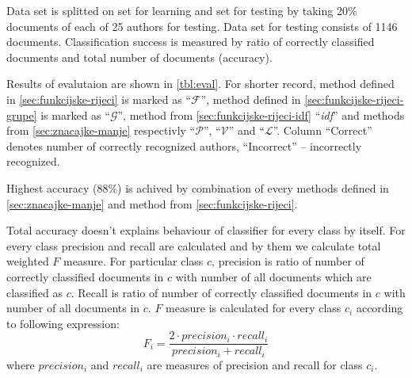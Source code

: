 \documentclass[11pt,english]{article}
\begin{document}
\begin{multicols}{2}
Data set is splitted on set for learning and set for testing by taking 20\%
documents of each of 25 authors for testing. Data set for testing consists of
1146 documents. Classification success is measured by ratio of correctly
classified documents and total number of documents (accuracy).

Results of evalutaion are shown in \ref{tbl:eval}. For shorter record, method
defined in \ref{sec:funkcijske-rijeci} is marked as ``$\mathcal{F}$'', method
defined in \ref{sec:funkcijske-rijeci-grupe} is marked as ``$\mathcal{G}$'',
method from \ref{sec:funkcijske-rijeci-idf} ``\emph{idf}'' and methods from
\ref{sec:znacajke-manje} respectivly ``$\mathcal{P}$'', ``$\mathcal{V}$'' and
``$\mathcal{L}$''. Column ``Correct'' denotes number of correctly
recognized authors, ``Incorrect'' -- incorrectly recognized.

Highest accuracy (88\%) is achived by combination of every methods defined in
\ref{sec:znacajke-manje} and method from \ref{sec:funkcijske-rijeci}.

Total accuracy doesn't explains behaviour of classifier for every class by
itself. For every class precision and recall are calculated and by them we
calculate total weighted $F$ measure. For particular class $c$, precision is
ratio of number of correctly classified documents in $c$ with number of all
documents which are classified as $c$. Recall is ratio of number of correctly
classified documents in $c$ with number of all documents in $c$. $F$ measure is
calculated for every class $c_i$ according to following expression:
\begin{equation}
F_i = \frac{2 \cdot precision_i \cdot recall_i}{precision_i + recall_i}
\end{equation}
where $precision_i$ and $recall_i$ are measures of precision and recall for
class $c_i$.


\end{multicols}
\end{document}

